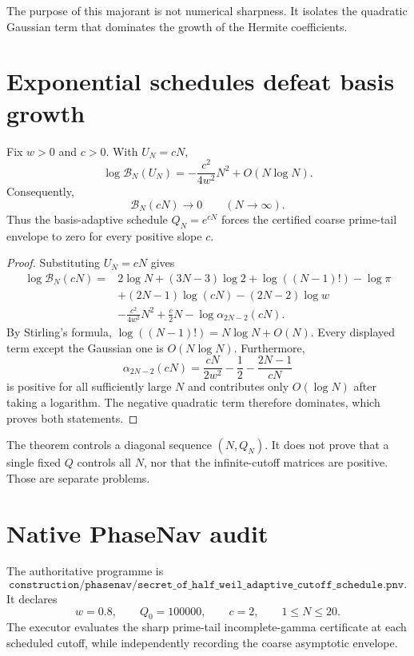 The purpose of this majorant is not numerical sharpness. It isolates the
quadratic Gaussian term that dominates the growth of the Hermite coefficients.

\section{Exponential schedules defeat basis growth}

\begin{theorem}
\label{thm:adaptive-cutoff-collapse}
Fix $w>0$ and $c>0$. With $U_N=cN$,
\[
 \log\mathcal B_N(U_N)
 =
 -\frac{c^2}{4w^2}N^2+O(N\log N).
\]
Consequently,
\[
 \mathcal B_N(cN)\longrightarrow0
 \qquad (N\to\infty).
\]
Thus the basis-adaptive schedule $Q_N=e^{cN}$ forces the certified coarse
prime-tail envelope to zero for every positive slope $c$.
\end{theorem}

\begin{proof}
Substituting $U_N=cN$ gives
\[
\begin{aligned}
 \log\mathcal B_N(cN)
 ={}&2\log N+(3N-3)\log2+\log((N-1)!)-\log\pi\\
 &+(2N-1)\log(cN)-(2N-2)\log w\\
 &-\frac{c^2}{4w^2}N^2+\frac c2N
 -\log\alpha_{2N-2}(cN).
\end{aligned}
\]
By Stirling's formula,
$\log((N-1)!)=N\log N+O(N)$. Every displayed term except the Gaussian one
is $O(N\log N)$. Furthermore,
\[
 \alpha_{2N-2}(cN)
 =
 \frac{cN}{2w^2}-\frac12-\frac{2N-1}{cN}
\]
is positive for all sufficiently large $N$ and contributes only $O(\log N)$
after taking a logarithm. The negative quadratic term therefore dominates,
which proves both statements.
\end{proof}

\begin{remark}
The theorem controls a diagonal sequence $(N,Q_N)$. It does not prove that a
single fixed $Q$ controls all $N$, nor that the infinite-cutoff matrices are
positive. Those are separate problems.
\end{remark}

\section{Native PhaseNav audit}

The authoritative programme is
\[
 \texttt{construction/phasenav/secret\_of\_half\_weil\_adaptive\_cutoff\_schedule.pnv}.
\]
It declares
\[
 w=0.8,
 \qquad
 Q_0=100000,
 \qquad
 c=2,
 \qquad
 1\le N\le20.
\]
The executor evaluates the sharp prime-tail incomplete-gamma certificate at
each scheduled cutoff, while independently recording the coarse asymptotic
envelope.

